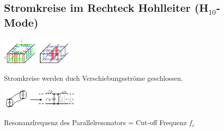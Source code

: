 \documentclass[english]{latex4ei/latex4ei_sheet}
\begin{document}
\begin{sectionbox}
	\subsection{Stromkreise im Rechteck Hohlleiter (H$_{10}$-Mode)}
	\begin{center}\includegraphics[width = 3.5cm]{./img/stromkreise-hl.jpeg}\end{center}
	Stromkreise werden duch Verschiebungsströme geschlossen.
	\begin{center}\includegraphics[width = 4cm]{./img/strom-hl.jpeg}\end{center}
	Resonanzfrequenz des Parallelresonators = Cut-off Frequenz $f_c$
\end{sectionbox}
\end{document}
